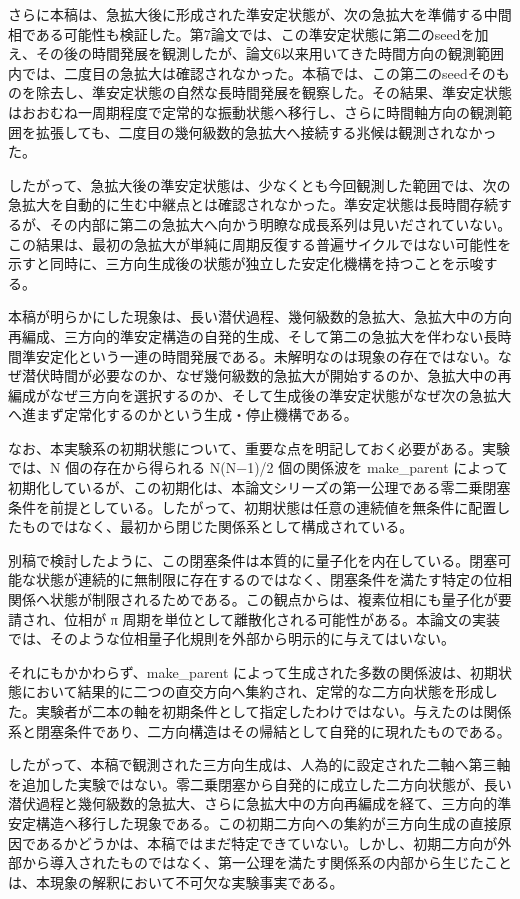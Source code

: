 \documentclass[
  a4paper,
]{ltjsarticle}
\begin{document}
さらに本稿は、急拡大後に形成された準安定状態が、次の急拡大を準備する中間相である可能性も検証した。第7論文では、この準安定状態に第二のseedを加え、その後の時間発展を観測したが、論文6以来用いてきた時間方向の観測範囲内では、二度目の急拡大は確認されなかった。本稿では、この第二のseedそのものを除去し、準安定状態の自然な長時間発展を観察した。その結果、準安定状態はおおむね一周期程度で定常的な振動状態へ移行し、さらに時間軸方向の観測範囲を拡張しても、二度目の幾何級数的急拡大へ接続する兆候は観測されなかった。

したがって、急拡大後の準安定状態は、少なくとも今回観測した範囲では、次の急拡大を自動的に生む中継点とは確認されなかった。準安定状態は長時間存続するが、その内部に第二の急拡大へ向かう明瞭な成長系列は見いだされていない。この結果は、最初の急拡大が単純に周期反復する普遍サイクルではない可能性を示すと同時に、三方向生成後の状態が独立した安定化機構を持つことを示唆する。

本稿が明らかにした現象は、長い潜伏過程、幾何級数的急拡大、急拡大中の方向再編成、三方向的準安定構造の自発的生成、そして第二の急拡大を伴わない長時間準安定化という一連の時間発展である。未解明なのは現象の存在ではない。なぜ潜伏時間が必要なのか、なぜ幾何級数的急拡大が開始するのか、急拡大中の再編成がなぜ三方向を選択するのか、そして生成後の準安定状態がなぜ次の急拡大へ進まず定常化するのかという生成・停止機構である。

なお、本実験系の初期状態について、重要な点を明記しておく必要がある。実験では、N
個の存在から得られる N(N−1)/2 個の関係波を make\_parent
によって初期化しているが、この初期化は、本論文シリーズの第一公理である零二乗閉塞条件を前提としている。したがって、初期状態は任意の連続値を無条件に配置したものではなく、最初から閉じた関係系として構成されている。

別稿で検討したように、この閉塞条件は本質的に量子化を内在している。閉塞可能な状態が連続的に無制限に存在するのではなく、閉塞条件を満たす特定の位相関係へ状態が制限されるためである。この観点からは、複素位相にも量子化が要請され、位相が
π
周期を単位として離散化される可能性がある。本論文の実装では、そのような位相量子化規則を外部から明示的に与えてはいない。

それにもかかわらず、make\_parent
によって生成された多数の関係波は、初期状態において結果的に二つの直交方向へ集約され、定常的な二方向状態を形成した。実験者が二本の軸を初期条件として指定したわけではない。与えたのは関係系と閉塞条件であり、二方向構造はその帰結として自発的に現れたものである。

したがって、本稿で観測された三方向生成は、人為的に設定された二軸へ第三軸を追加した実験ではない。零二乗閉塞から自発的に成立した二方向状態が、長い潜伏過程と幾何級数的急拡大、さらに急拡大中の方向再編成を経て、三方向的準安定構造へ移行した現象である。この初期二方向への集約が三方向生成の直接原因であるかどうかは、本稿ではまだ特定できていない。しかし、初期二方向が外部から導入されたものではなく、第一公理を満たす関係系の内部から生じたことは、本現象の解釈において不可欠な実験事実である。
\end{document}
